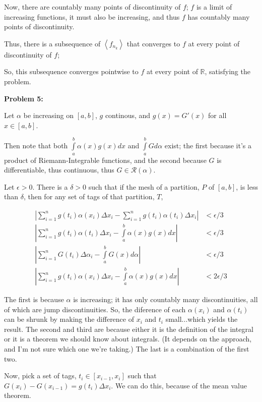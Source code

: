 \documentclass[a4paper,12pt]{article}
\newcommand{\tab}{\hspace{4mm}} %
\newcommand{\shunt}{\vspace{20mm}}
\newcommand{\absval}[1]{\left\lvert #1 \right\rvert}
\newcommand{\anbrack}[1]{\left\langle #1 \right\rangle}
\newcommand{\al}{\alpha} %
\newcommand{\de}{\delta}
\newcommand{\De}{\Delta}
\newcommand{\ep}{\epsilon}
\newcommand{\R}{\mathbb{R}}
\newcommand{\scrR}{\mathcal{R}}
\begin{document}
\tab %

Now, there are countably many points of discontinuity of $f$; $f$ is a limit of increasing functions, it must also be increasing, and thus $f$ has countably many points of discontinuity.

Thus, there is a subsequence of $\anbrack{f_{n_k}}$ that converges to $f$ at every point of discontinuity of $f$; %

So, this subsequence converges pointwise to $f$ at every point of $\R$, satisfying the problem. 

\shunt

{\bf Problem 5:}

Let $\al$ be increasing on $[a,b]$, $g$ continous, and $g(x) = G'(x)$ for all $x \in [a,b]$.

Then note that both $\int\limits_a^b \al(x)g(x)dx$ and $\int\limits_a^b Gd\al$ exist; the first because it's a product of Riemann-Integrable functions, and the second because $G$ is differentiable, thus continuous, thus $G \in \scrR(\al)$.

Let $\ep >0$. There is a $\de >0$ such that if the mesh of a partition, $P$ of $[a,b]$, is less than $\de$, then for any set of tags of that partition, $T$,

\begin{align*}
\absval{\sum\limits_{i=1}^n g(t_i)\al(x_i) \Delta x_i - \sum\limits_{i=1}^n g(t_i)\al(t_i) \Delta x_i} &< \ep/3 \\
\absval{\sum\limits_{i=1}^n g(t_i)\al(t_i) \Delta x_i - \int\limits_a^b \al(x)g(x)dx} &< \ep/3 \\
\absval{\sum\limits_{i=1}^n G(t_i)\Delta \al_i - \int\limits_a^b G(x)d\al} &< \ep/3 \\
\absval{\sum\limits_{i=1}^n g(t_i)\al(x_i) \Delta x_i - \int\limits_a^b \al(x)g(x)dx} &< 2\ep/3
\end{align*}

The first is because $\al$ is increasing; it has only countably many discontinuities, all of which are jump discontinuities. So, the diference of each $\al(x_i)$ and $\al(t_i)$ can be shrunk by making the difference of $x_i$ and $t_i$ small...which yields the result. The second and third are because either it is the definition of the integral or it is a theorem we should know about integrals. (It depends on the approach, and I'm not sure which one we're taking.) The last is a combination of the first two.

Now, pick a set of tags, $t_i \in [x_{i-1},x_i]$ such that $G(x_i) - G(x_{i-1}) = g(t_i)\De x_i$. We can do this, because of the mean value theorem.
\end{document}

